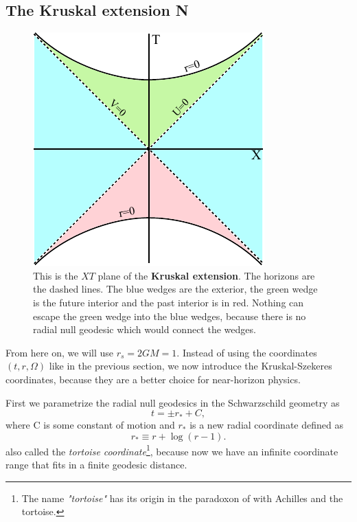\subsection{The Kruskal extension \textbf{N}}
		\begin{figure}[htbp]
			\begin{center}
				\includegraphics[scale=1]{kruskal}
			\end{center}
			\caption{This is the $XT$ plane of the \textbf{Kruskal extension}. The horizons are the dashed lines. The blue wedges are the exterior, the green wedge is the future interior and the past interior is in red. Nothing can escape the green wedge into the blue wedges, because there is no radial null geodesic which would connect the wedges.}\label{kruskal}	
		\end{figure}
	From here on, we will use $r_{s}=2GM=1$.
	Instead of using the coordinates $(t,r,\Omega)$ like in the previous section, we now introduce the Kruskal-Szekeres coordinates, because they are a better choice for near-horizon physics.
	
	First we parametrize the radial null geodesics in the Schwarzschild geometry as
		\begin{equation}
			t=\pm r_{*} + C,
		\end{equation}
	where C is some constant of motion and $r_{*}$ is a new radial coordinate defined as
		\begin{equation} \label{r_*tortoise}
			r_{*}\equiv r+\log (r-1).
		\end{equation}
	also called the \textit{tortoise coordinate}\footnote{The name \textit{"tortoise"} has its origin in the paradoxon of with Achilles and the tortoise.}, because now we have an infinite coordinate range that fits in a finite geodesic distance.
		
